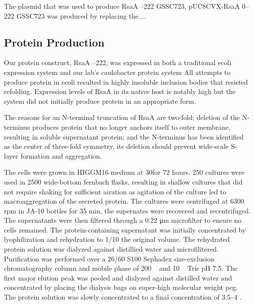 The plasmid that was used to produce RsaA --222 GSSC723, pUC8CVX-RsaA \del{}0--222 GSSC723 was produced by replacing the.... 
\subsection{Protein Production}
\label{sub:crystal-protein-production}

Our protein construct, RsaA --222, was expressed in both a traditional
\ac{ecoli} expression system and our lab's \ac{caulobacter}
protein system
 All attempts to produce protein in \ac{ecoli}
resulted in highly insoluble inclusion bodies that resisted
refolding. Expression levels of RsaA in its native host is notably high but
the system did not initially produce protein in an appropriate form.

The reasons for an N-terminal truncation of RsaA are two-fold; deletion
of the N-terminus produces protein that no longer anchors itself to
outer membrane, resulting in soluble supernatant protein; and the
N-terminus has been identified as the center of three-fold symmetry, its
deletion should prevent wide-scale \ac{S-layer} formation and aggregation.

The cells were grown in HIGGM16 medium
at 30\cel for 72 hours. 250 \millilitre cultures
were used in 2500 \millilitre wide-bottom fernbach flasks, resulting in shallow
cultures that did not require shaking for sufficient airation as
agitation of the culture led to macroaggregation of the secreted
protein. The cultures were centrifuged at 6300 rpm in JA-10 bottles for
35 min, the supernates were recovered and recentrifuged. The
supernatants were then filtered through a 0.22 \si{\micro\meter} microfilter to ensure
no cells remained. The protein-containing supernatant was initially
concentrated by lyophilization and rehydration to 1/10 the original
volume. The rehydrated protein solution was dialyzed against distillied
water and microfilitered. Purification was performed over a 26/60 S100
Sephadex size-exclusion chromatography column and mobile phase of 200 \si{\milli\molar}  and 10 \si{\milli\molar}
Tris pH 7.5. The first major elution peak was pooled and dialyzed
against distilled water and concentrated by placing the dialysis bags on
super-high molecular weight \ac{peg}. The protein
solution was slowly concentrated to a final concentration of 3.5--4
\mgperml.

